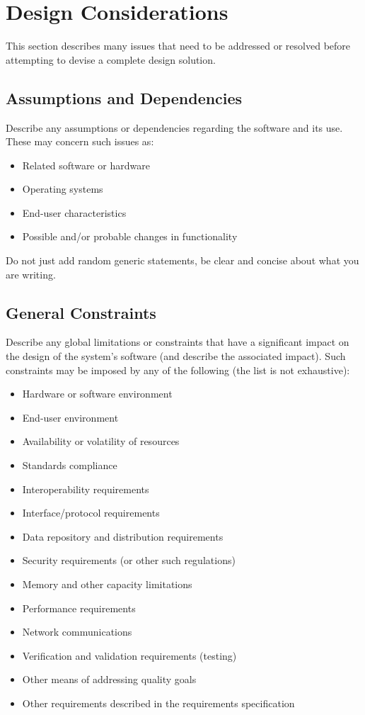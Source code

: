 \documentclass{FastFyp}
\begin{document}
\section{Design Considerations}
This section describes many issues that need to be addressed or resolved before attempting to devise a complete design solution.
\subsection{Assumptions and Dependencies}
Describe any assumptions or dependencies regarding the software and its use. These may concern such issues as:
\begin{itemize}
\item Related software or hardware 
  \item Operating systems 
  \item End-user characteristics 
  \item Possible and/or probable changes in functionality
\end{itemize}
Do not just add random generic statements, be clear and concise about what you are writing.
\subsection{General Constraints}
Describe any global limitations or constraints that have a significant impact on the design of the system's software (and describe the associated impact). Such constraints may be imposed by any of the following (the list is not exhaustive):
\begin{itemize}
\item Hardware or software environment 
\item End-user environment 
\item Availability or volatility of resources 
\item Standards compliance 
\item Interoperability requirements 
\item Interface/protocol requirements 
\item Data repository and distribution requirements 
\item Security requirements (or other such regulations) 
\item Memory and other capacity limitations 
\item Performance requirements 
\item Network communications 
\item Verification and validation requirements (testing) 
\item Other means of addressing quality goals 
\item Other requirements described in the requirements specification 
\end{itemize}
\end{document}
